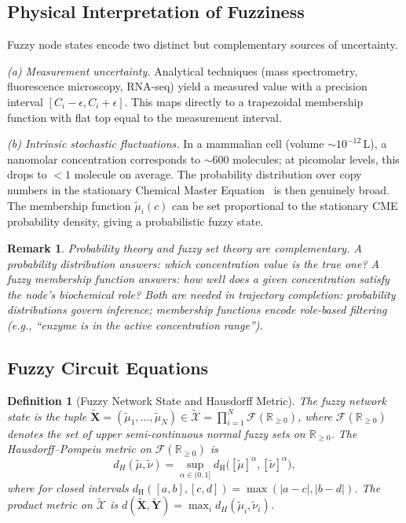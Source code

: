 \documentclass[twocolumn,10pt,a4paper]{article}
\newtheorem{definition}[theorem]{Definition}
\newtheorem{remark}[theorem]{Remark}
\begin{document}
\subsection{Physical Interpretation of Fuzziness}
\label{sec:fuzzy-physical}

Fuzzy node states encode two distinct but complementary sources of uncertainty.

\emph{(a) Measurement uncertainty.}  Analytical techniques (mass spectrometry,
fluorescence microscopy, RNA-seq) yield a measured value with a precision
interval $[C_i-\epsilon,C_i+\epsilon]$.  This maps directly to a trapezoidal
membership function with flat top equal to the measurement interval.

\emph{(b) Intrinsic stochastic fluctuations.}  In a mammalian cell
(volume $\sim 10^{-12}$\,L), a nanomolar concentration corresponds to
$\sim 600$ molecules; at picomolar levels, this drops to $<1$ molecule on
average.  The probability distribution over copy numbers in the stationary
Chemical Master Equation~\cite{vanKampen2007,Gillespie1977} is then genuinely
broad.  The membership function $\tilde{\mu}_i(c)$ can be set proportional to
the stationary CME probability density, giving a probabilistic fuzzy state.

\begin{remark}
Probability theory and fuzzy set theory are complementary.  A probability
distribution answers: \emph{which} concentration value is the true one?  A
fuzzy membership function answers: \emph{how well} does a given concentration
satisfy the node's biochemical role?  Both are needed in trajectory completion:
probability distributions govern inference; membership functions encode
role-based filtering (e.g., ``enzyme is in the active concentration range'').
\end{remark}

\subsection{Fuzzy Circuit Equations}
\label{sec:fuzzy-circuit}

\begin{definition}[Fuzzy Network State and Hausdorff Metric]
\label{def:fuzzy-net}
The \emph{fuzzy network state} is the tuple
$\widetilde{\mathbf{X}}=(\tilde{\mu}_1,\ldots,\tilde{\mu}_N)
\in\widetilde{\mathcal{X}}=\prod_{i=1}^N\mathcal{F}(\mathbb{R}_{\geq 0})$,
where $\mathcal{F}(\mathbb{R}_{\geq 0})$ denotes the set of upper
semi-continuous normal fuzzy sets on $\mathbb{R}_{\geq 0}$.  The
\emph{Hausdorff--Pompeiu metric} on $\mathcal{F}(\mathbb{R}_{\geq 0})$
is~\cite{Hausdorff1914}
\begin{equation}
  d_H(\tilde{\mu},\tilde{\nu})=\sup_{\alpha\in(0,1]}
    d_{\mathrm{H}}\bigl([\tilde{\mu}]^\alpha,[\tilde{\nu}]^\alpha\bigr),
  \label{eq:hausdorff}
\end{equation}
where for closed intervals
$d_{\mathrm{H}}([a,b],[c,d])=\max(|a-c|,|b-d|)$.  The product metric on
$\widetilde{\mathcal{X}}$ is
$d(\widetilde{\mathbf{X}},\widetilde{\mathbf{Y}})=\max_i d_H(\tilde{\mu}_i,\tilde{\nu}_i)$.
\end{definition}
\end{document}
